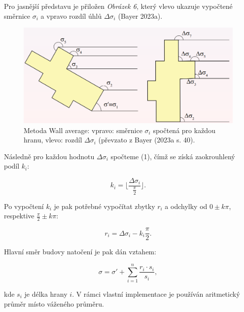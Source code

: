 \par Pro jasnější představu je přiložen \emph{Obrázek 6}, který vlevo ukazuje vypočtené směrnice $\sigma_i$ a vpravo rozdíl úhlů  $\Delta\sigma_i$ (Bayer 2023a).

\begin{figure}[h]
\centering
\includegraphics[width=14cm]{images/Wall_average.png} 
    \caption{Metoda Wall average: vpravo: směrnice $\sigma_i$ spočtená pro každou hranu, vlevo: rozdíl $\Delta\sigma_i$ (převzato z Bayer (2023a s. 40).}
\end{figure}

\newpage

\par Následně pro každou hodnotu $\Delta\sigma_i$ spočteme (1), čímž se získá zaokrouhlený podíl $k_i$:

\begin{equation}k_i = \biggl\lfloor \frac{\Delta\sigma_i}{\frac{\pi}{2}} \biggr\rfloor.\end{equation}

\par Po vypočtení $k_i$ je pak potřebné vypočítat zbytky $r_i$ a odchylky od $0 \pm k\pi$, respektive  $\frac{\pi}{2} \pm k\pi$:

\begin{equation} r_i = \Delta\sigma_i - k_i \frac{\pi}{2} .\end{equation}

\par Hlavní směr budovy natočení je pak dán vztahem:

\begin{equation} \sigma = \sigma' + \sum_{i=1}^n \frac{r_i \cdot s_i}{s_i}, \end{equation}

\par kde $s_i$ je délka hrany $i$. V rámci vlastní implementace je používán aritmetický průměr místo váženého průměru. 

